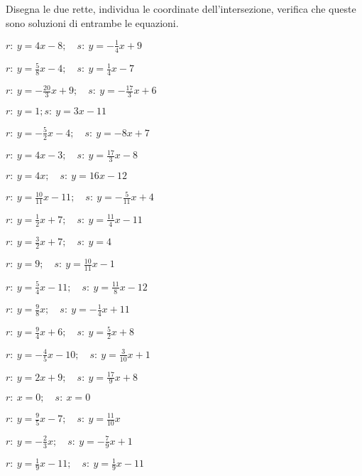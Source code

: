 \begin{esercizio}\label{ese:}
 Disegna le due rette, individua le 
coordinate dell'intersezione, verifica che queste sono soluzioni di 
entrambe le equazioni.
 \begin{multicols}{2}
 \begin{enumeratea}
  \item  $r:~y = 4 x -8; \quad s:~y = -\frac{1}{4} x +9$
  \item  $r:~y = \frac{5}{8} x -4; \quad s:~y = \frac{1}{4} x -7$
  \item  $r:~y = -\frac{20}{3} x +9; \quad s:~y = -\frac{17}{3} x +6$
  \item  $r:~y = 1; s:~y = 3 x -11$
  \item  $r:~y = -\frac{5}{2} x -4; \quad s:~y = -8 x +7$
  \item  $r:~y = 4 x -3; \quad s:~y = \frac{17}{3} x -8$
  \item  $r:~y = 4 x ; \quad s:~y = 16 x -12$
  \item  $r:~y = \frac{10}{11} x -11; \quad s:~y = -\frac{5}{11} x +4$
  \item  $r:~y = \frac{1}{2} x +7; \quad s:~y = \frac{11}{4} x -11$
  \item  $r:~y = \frac{3}{2} x +7; \quad s:~y = 4$
  \item  $r:~y = 9; \quad s:~y = \frac{10}{11} x -1$
  \item  $r:~y = \frac{5}{4} x -11; \quad s:~y = \frac{11}{8} x -12$
  \item  $r:~y = \frac{9}{8} x ; \quad s:~y = -\frac{1}{4} x +11$
  \item  $r:~y = \frac{9}{4} x +6; \quad s:~y = \frac{5}{2} x +8$
  \item  $r:~y = -\frac{4}{5} x -10; \quad s:~y = \frac{3}{10} x +1$
  \item  $r:~y = 2 x +9; \quad s:~y = \frac{17}{9} x +8$
  \item  $r:~x = 0; \quad s:~x = 0$
  \item  $r:~y = \frac{9}{5} x -7; \quad s:~y = \frac{11}{10} x $
  \item  $r:~y = -\frac{2}{3} x ; \quad s:~y = -\frac{7}{9} x +1$
  \item  $r:~y = \frac{1}{9} x -11; \quad s:~y = \frac{1}{9} x -11$
 \end{enumeratea}
 \end{multicols}
\end{esercizio}

